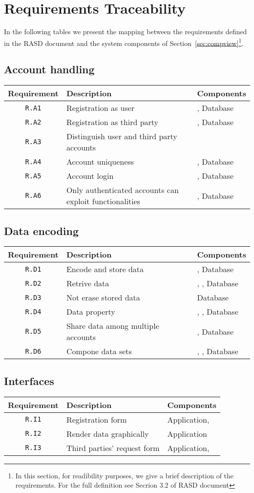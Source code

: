 \documentclass[../DD0.tex]{subfiles}
\newcommand{\tracMatrix}[3] {
  \begin{table}[h!]
    \centering
    \begin{tabularx}{\linewidth}{|c|X|X|}
      \hline
      \textbf{Requirement} & \textbf{Description} & \textbf{Components} \\
      #3
      \hline
    \end{tabularx}
    \label{tab:#2}
  \end{table}
}
\newcommand{\tracRow}[3] {
  \hline \texttt{R.#1} & #2 & #3 \\
}
\begin{document}
\section{Requirements Traceability}
\label{sec:req}

  In the following tables we present the mapping between the requirements defined in the RASD document and the system components of Section~\ref{sec:compview}\footnote{In this section, for readibility purposes, we give a brief description of the requirements. For the full definition see Secrion 3.2 of RASD document}.

  \subsection{Account handling}

    \tracMatrix{}{accounthandling}{
      \tracRow{A1}{Registration as user}{\AccountManager, Database}
      \tracRow{A2}{Registration as third party}{\AccountManager, Database}
      \tracRow{A3}{Distinguish user and third party accounts}{\AccountManager}
      \tracRow{A4}{Account uniqueness}{\AccountManager, Database}
      \tracRow{A5}{Account login}{\AccountManager, Database}
      \tracRow{A6}{Only authenticated accounts can exploit functionalities}{\AccountManager, Database}
    }

  \subsection{Data encoding}

    \tracMatrix{}{dataencoding}{
      \tracRow{D1}{Encode and store data}{\DataCollector, Database}
      \tracRow{D2}{Retrive data}{\SetBuilder, \FilterManager, Database}
      \tracRow{D3}{Not erase stored data}{Database}
      \tracRow{D4}{Data property}{\AccountManager, \DataCollector, Database}
      \tracRow{D5}{Share data among multiple accounts}{\AccountManager, Database}
      \tracRow{D6}{Compone data sets}{\SetBuilder, \FilterManager, Database}
    }

  \clearpage
  \subsection{Interfaces}

    \tracMatrix{}{tracinterfaces}{
      \tracRow{I1}{Registration form}{Application, \AccountManager}
      \tracRow{I2}{Render data graphically}{Application}
      \tracRow{I3}{Third parties' request form}{Application, \RequestManager}
    }
\end{document}
